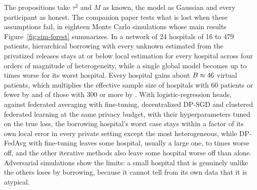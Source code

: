 \documentclass[acmsmall,screen,review]{acmart}
\theoremstyle{acmdefinition}
\begin{document}
The propositions take $\tau^2$ and $M$ as known, the model as Gaussian and every participant as honest. The companion paper \cite{simoes2026ghb} tests what is lost when these assumptions fail, in eighteen Monte Carlo simulations whose main results Figure~\ref{fig:sim-forest} summarizes. In a network of 24 hospitals of 16 to 479 patients, hierarchical borrowing with every unknown estimated from the privatized releases stays at or below local estimation for every hospital across four orders of magnitude of heterogeneity, while a single global model becomes up to \SimTwoWorstPool{} times worse for its worst hospital. Every hospital gains about $B\approx46$ virtual patients, which multiplies the effective sample size of hospitals with 60 patients or fewer by \SimThreeSmall{} and of those with 300 or more by \SimThreeLarge. With logistic-regression heads, against federated averaging with fine-tuning, decentralized DP-SGD and clustered federated learning at the same privacy budget, with their hyperparameters tuned on the true loss, the borrowing hospital's worst case stays within a factor \SimFifteenGHBWorstMax{} of its own local error in every private setting except the most heterogeneous, while DP-FedAvg \cite{mcmahan2018learning} with fine-tuning leaves some hospital, usually a large one, \SimFifteenFTWorstMin{} to \SimFifteenFTWorstMax{} times worse off, and the other iterative methods also leave some hospital worse off than alone. Adversarial simulations show the limits: a small hospital that is genuinely unlike the others loses by borrowing, because it cannot tell from its own data that it is atypical.
\end{document}
